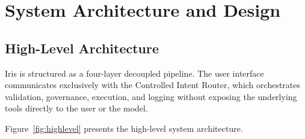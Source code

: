 \chapter{System Architecture and Design}

\section{High-Level Architecture}

Iris is structured as a four-layer decoupled pipeline. The user interface communicates exclusively with the Controlled Intent Router, which orchestrates validation, governance, execution, and logging without exposing the underlying tools directly to the user or the model.

Figure~\ref{fig:highlevel} presents the high-level system architecture.

